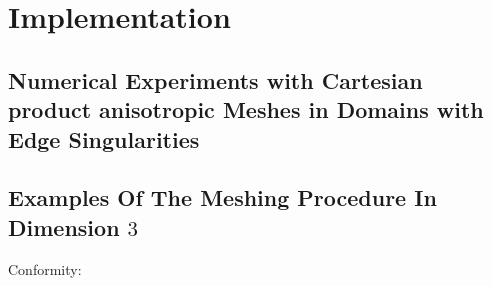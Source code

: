 \chapter{Implementation}
\section{Numerical Experiments with Cartesian product anisotropic Meshes in Domains with Edge Singularities}
\edgedomain
\tableErrorsUniformCylinder
\tableErrorsAnisoCylinder
\section{Examples Of The Meshing Procedure In Dimension $3$} %
\label{sec:examples_of_the_meshing_procedure}
\tauZero
\newpage
{}
\newpage
\tauOneEnCube
\tauOneEn
\newpage
Conformity:
\conform